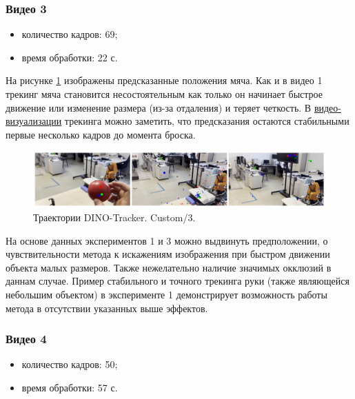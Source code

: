 \documentclass[a4paper, 14pt]{extarticle}
\theoremstyle{definition}
\theoremstyle{plain}
\theoremstyle{remark}
\begin{document}
\subsubsection{Видео 3}
\begin{itemize}
	\item количество кадров: 69;
	\item время обработки: 22 с.
\end{itemize}

На рисунке \ref{fig:custom-3} изображены предсказанные положения мяча. Как и в видео 1 трекинг мяча становится несостоятельным как только он начинает быстрое движение или изменение размера (из-за отдаления) и теряет четкость. В \href{https://drive.google.com/file/d/1u9dOc59ZkDruSFHMgPoj0jT528nW_ne4/view?usp=drive_link}{видео-визуализации} трекинга можно заметить, что предсказания остаются стабильными первые несколько кадров до момента броска.
\begin{figure}
    [H]
    \centering
    \includegraphics[width=\textwidth]{figs/custom-3.png}
    \caption{Траектории DINO-Tracker. Custom/3.}
    \label{fig:custom-3}
\end{figure}

На основе данных экспериментов 1 и 3 можно выдвинуть предположении, о чувствительности метода к искажениям изображения при быстром движении объекта малых размеров. Также нежелательно наличие значимых окклюзий в даннам случае. Пример стабильного и точного трекинга руки (также являющейся небольшим объектом) в эксперименте 1 демонстрирует возможность работы метода в отсутствии указанных выше эффектов.

\subsubsection{Видео 4}
\begin{itemize}
	\item количество кадров: 50;
	\item время обработки: 57 с.
\end{itemize}
\end{document}
